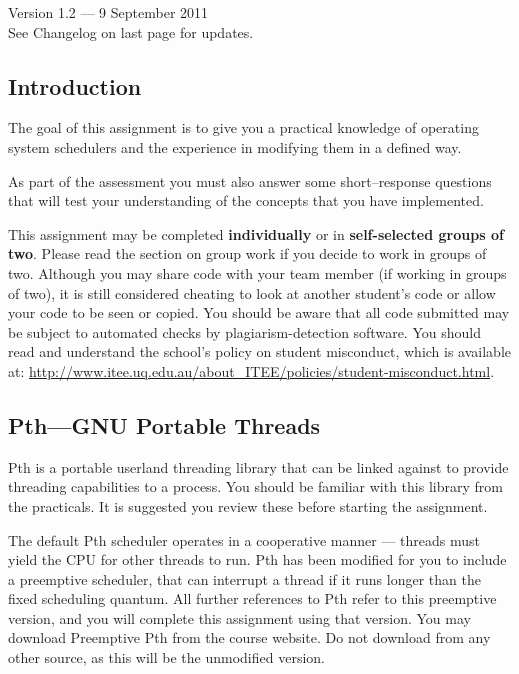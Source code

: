 \documentclass[12pt,a4paper]{article}
\begin{document}


\begin{center}
\color{blue}
Version 1.2 --- 9 September 2011 \\
See Changelog on last page for updates.
\end{center}

\subsection*{Introduction}

The goal of this assignment is to give you a practical knowledge of operating
system schedulers and the experience in modifying them in a defined way.

As part of the assessment you must also answer some short--response questions
that will test your understanding of the concepts that you have implemented.

This assignment may be completed \textbf{individually} or in
\textbf{self-selected groups of two}. Please read the section on group work if
you decide to work in groups of two. Although you may share code with your team
member (if working in groups of two), it is still considered cheating to look
at another student's code or allow your code to be seen or copied. You should
be aware that all code submitted may be subject to automated checks by
plagiarism-detection software.  You should read and understand the school's
policy on student misconduct, which is available at:
\url{http://www.itee.uq.edu.au/about_ITEE/policies/student-misconduct.html}.

\subsection*{Pth---GNU Portable Threads}

Pth is a portable userland threading library that can be linked against to
provide threading capabilities to a process. You should be familiar with this
library from the practicals. It is suggested you review these before starting
the assignment.

The default Pth scheduler operates in a cooperative manner --- threads must
yield the CPU for other threads to run. Pth has been modified for you to
include a preemptive scheduler, that can interrupt a thread if it runs longer
than the fixed scheduling quantum. All further references to Pth refer to this
preemptive version, and you will complete this assignment using that version.
You may download Preemptive Pth from the course website. Do not download from any
other source, as this will be the unmodified version.
\end{document}
